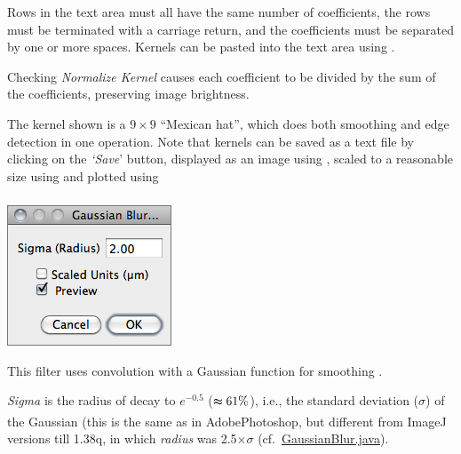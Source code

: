 \medskip{}


Rows in the text area must all have the same number of coefficients,
the rows must be terminated with a carriage return, and the coefficients
must be separated by one or more spaces. Kernels can be pasted into
the text area using  \negthinspace{}. 

Checking \emph{Normalize Kernel} causes each coefficient to be divided
by the sum of the coefficients, preserving image brightness.

The kernel shown is a $9\times9$ ``Mexican hat'', which does both
smoothing and edge detection in one operation. Note that kernels can
be saved as a text file by clicking on the \emph{`Save}' button,
displayed as an image using ,
scaled to a reasonable size using 
and plotted using 




\subsubsection[\protect\userinterface{Gaussian Blur\ldots{}}]{\protect{}\label{sub:Gaussian-Blur...}}

\begin{minipage}[c][1\totalheight][t]{0.28\columnwidth}%
\includegraphics[scale=0.55]{images/GaussianBlur}%
\end{minipage}%
\begin{minipage}[c][1\totalheight][t]{0.72\columnwidth}%
This filter uses convolution with a Gaussian function for smoothing
\cite{C-GaussianBlur}.\medskip{}


\emph{Sigma} is the radius of decay to $e^{-0.5}$ ($\thickapprox61\%$),
i.e., the standard deviation ($\sigma$) of the Gaussian (this is
the same as in Adobe\textsuperscript{{\tiny \textregistered}}Photoshop\textsuperscript{{\tiny \textregistered}},
but different from ImageJ versions till 1.38q, in which \emph{radius}
was 2.5$\times\sigma$ (cf.\ \href{http://imagej.nih.gov/ij/docs/source/ij/plugin/filter/GaussianBlur.java.html}{GaussianBlur.java}).%
\end{minipage}\medskip{}


